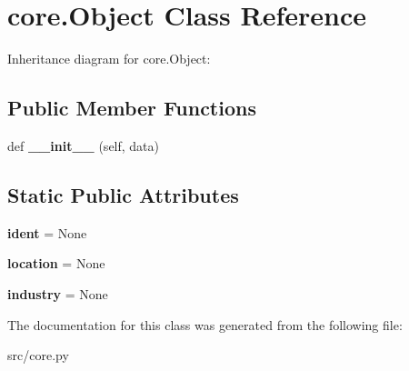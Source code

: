 \hypertarget{classcore_1_1_object}{}\section{core.\+Object Class Reference}
\label{classcore_1_1_object}


Inheritance diagram for core.\+Object\+:
\subsection*{Public Member Functions}
\begin{DoxyCompactItemize}
\item 
\mbox{\label{classcore_1_1_object_a33f21dc66d401a1c70e736da8ca18528}} 
def {\bfseries \+\_\+\+\_\+init\+\_\+\+\_\+} (self, data)
\end{DoxyCompactItemize}
\subsection*{Static Public Attributes}
\begin{DoxyCompactItemize}
\item 
\mbox{\label{classcore_1_1_object_adf6a0b61019a2d0e9449f7039fa31e6f}} 
{\bfseries ident} = None
\item 
\mbox{\label{classcore_1_1_object_afebe98d67142c6e7dd0ce41e6e183c8f}} 
{\bfseries location} = None
\item 
\mbox{\label{classcore_1_1_object_a1bc3e668a4caf0776852811bf4d8c509}} 
{\bfseries industry} = None
\end{DoxyCompactItemize}


The documentation for this class was generated from the following file\+:\begin{DoxyCompactItemize}
\item 
src/core.\+py\end{DoxyCompactItemize}
